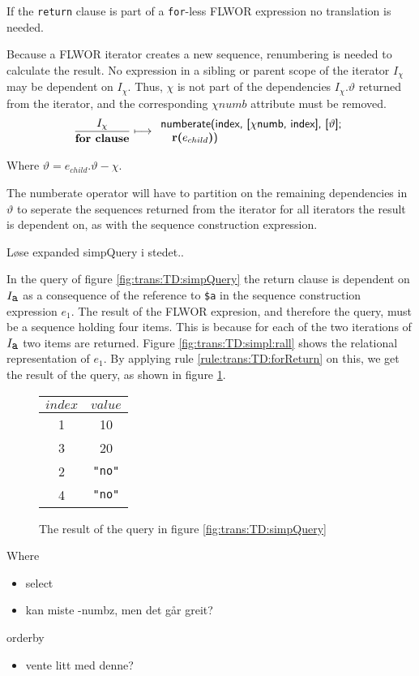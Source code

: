 If the \texttt{return} clause is part of a \texttt{for}-less FLWOR expression no translation is needed.

Because a FLWOR iterator creates a new sequence, renumbering is needed to calculate the result. No expression in a
sibling or parent scope of the iterator $I_{\chi}$ may be dependent on $I_{\chi}$. Thus, $\chi$ is not part of the
dependencies $I_{\chi}.\vartheta$ returned from the iterator, and the corresponding $\chi{numb}$ attribute must be
removed.
\begin{equation}
\frac{I_{\chi}}{\mbox{\textbf{for clause}}}
\longmapsto
\begin{array}{l}
\mbox{\textsf{numberate(index, [}}\chi\mbox{\textsf{numb, index], [}}\vartheta\mbox{\textsf{];}} \\ \quad
\mbox{\textbf{r(}}e_{child}\mbox{\textbf{)}\textsf{)}}
\end{array}
\label{rule:trans:TD:forReturn}
\end{equation}

Where $\vartheta = e_{child}.\vartheta - \chi$.

The \textsf{numberate} operator will have to partition on the remaining dependencies in $\vartheta$ to seperate
the sequences returned from the iterator for all iterators the result is dependent on, as with the sequence
construction expression.

\begin{myExample}
L\o se expanded simpQuery i stedet..

In the query of figure \ref{fig:trans:TD:simpQuery} the return clause is dependent on $I_{\mbox{\texttt{a}}}$
as a consequence of the reference to \texttt{\$a} in the sequence construction expression $e_{1}$. The result of
the FLWOR expresion, and therefore the query, must be a sequence holding four items. This is because for each of
the two iterations of $I_{\mbox{\texttt{a}}}$ two items are returned. Figure \ref{fig:trans:TD:simpl:rall} shows
the relational representation of $e_{1}$. By applying rule \ref{rule:trans:TD:forReturn} on this, we get the
result of the query, as shown in figure \ref{fig:trans:TD:simpRes}.

\begin{figure}[h]
\centering
\begin{tabular}{|c|c|} \hline
$index$ & $value$ \\\hline
1 & 10 \\\hline
3 & 20 \\\hline
2 & \texttt{"no"} \\\hline
4 & \texttt{"no"} \\\hline
\end{tabular}
\caption{The result of the query in figure \ref{fig:trans:TD:simpQuery}}
\label{fig:trans:TD:simpRes}
\end{figure}

\end{myExample}


Where
\begin{itemize}
  \item select
  \item kan miste -numbz, men det g\aa r greit?
\end{itemize}

orderby
\begin{itemize}
  \item vente litt med denne?
\end{itemize}

